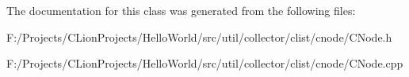 The documentation for this class was generated from the following files\+:\begin{DoxyCompactItemize}
\item 
F\+:/\+Projects/\+C\+Lion\+Projects/\+Hello\+World/src/util/collector/clist/cnode/C\+Node.\+h\item 
F\+:/\+Projects/\+C\+Lion\+Projects/\+Hello\+World/src/util/collector/clist/cnode/C\+Node.\+cpp\end{DoxyCompactItemize}
